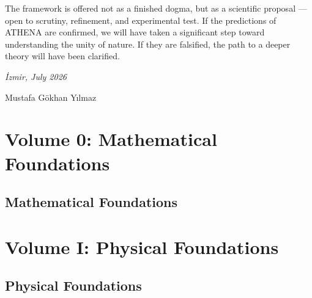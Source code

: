 \documentclass[12pt,oneside]{book}
\begin{document}
The framework is offered not as a finished dogma, but as a scientific proposal — open to scrutiny, refinement, and experimental test. If the predictions of ATHENA are confirmed, we will have taken a significant step toward understanding the unity of nature. If they are falsified, the path to a deeper theory will have been clarified.

\vspace{0.5cm}
\textit{İzmir, July 2026}

\vspace{0.5cm}
Mustafa Gökhan Yılmaz


\tableofcontents


\mainmatter

%
% 
% 
% 
% 
% 
%

\part{Volume 0: Mathematical Foundations}
\chapter*{Mathematical Foundations}

\part{Volume I: Physical Foundations}
\chapter*{Physical Foundations}
\end{document}
